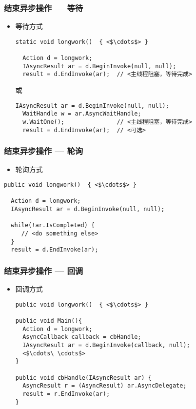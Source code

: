 \begin{frame}[fragile]
\frametitle{结束异步操作 --- 等待}

\begin{itemize}
\item 等待方式
\begin{lstlisting}[escapeinside=<>]
static void longwork()  { <$\cdots$> }

  Action d = longwork;
  IAsyncResult ar = d.BeginInvoke(null, null);
  result = d.EndInvoke(ar);  // <主线程阻塞，等待完成>
\end{lstlisting}
或
\begin{lstlisting}[escapeinside=<>]
  IAsyncResult ar = d.BeginInvoke(null, null);
  WaitHandle w = ar.AsyncWaitHandle;
  w.WaitOne();               // <主线程阻塞，等待完成>
  result = d.EndInvoke(ar);  // <可选>
\end{lstlisting}
\end{itemize}
\end{frame}

\begin{frame}[fragile]
\frametitle{结束异步操作 --- 轮询}
\begin{itemize}
\item 轮询方式
\end{itemize}
\begin{lstlisting}[escapeinside=<>]
public void longwork()  { <$\cdots$> }

  Action d = longwork;
  IAsyncResult ar = d.BeginInvoke(null, null);
  
  while(!ar.IsCompleted) {
     // <do something else>
  }
  result = d.EndInvoke(ar);
\end{lstlisting}
\end{frame}

\begin{frame}[fragile]
\frametitle{结束异步操作 --- 回调}

\begin{itemize}
\item 回调方式
\begin{lstlisting}[escapeinside=<>]
public void longwork()  { <$\cdots$> }

public void Main(){
  Action d = longwork;
  AsyncCallback callback = cbHandle;
  IAsyncResult ar = d.BeginInvoke(callback, null);
  <$\cdots\ \cdots$>
}

public void cbHandle(IAsyncResult ar) {
  AsyncResult r = (AsyncResult) ar.AsyncDelegate;
  result = r.EndInvoke(ar);
}
\end{lstlisting}
\end{itemize}
\end{frame}

